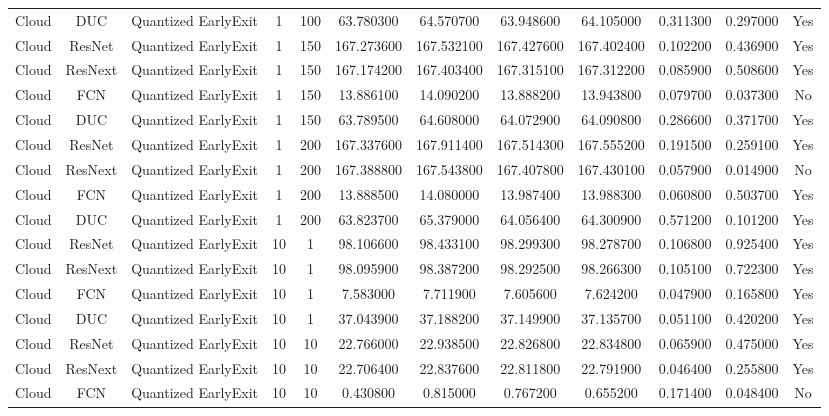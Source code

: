 \begin{tabular}{|c||c||c||c||c||c||c||c||c||c||c||c|}
Cloud & DUC & Quantized EarlyExit & 1 & 100 & 63.780300 & 64.570700 & 63.948600 & 64.105000 & 0.311300 & 0.297000 & Yes \\
Cloud & ResNet & Quantized EarlyExit & 1 & 150 & 167.273600 & 167.532100 & 167.427600 & 167.402400 & 0.102200 & 0.436900 & Yes \\
Cloud & ResNext & Quantized EarlyExit & 1 & 150 & 167.174200 & 167.403400 & 167.315100 & 167.312200 & 0.085900 & 0.508600 & Yes \\
Cloud & FCN & Quantized EarlyExit & 1 & 150 & 13.886100 & 14.090200 & 13.888200 & 13.943800 & 0.079700 & 0.037300 & No \\
Cloud & DUC & Quantized EarlyExit & 1 & 150 & 63.789500 & 64.608000 & 64.072900 & 64.090800 & 0.286600 & 0.371700 & Yes \\
Cloud & ResNet & Quantized EarlyExit & 1 & 200 & 167.337600 & 167.911400 & 167.514300 & 167.555200 & 0.191500 & 0.259100 & Yes \\
Cloud & ResNext & Quantized EarlyExit & 1 & 200 & 167.388800 & 167.543800 & 167.407800 & 167.430100 & 0.057900 & 0.014900 & No \\
Cloud & FCN & Quantized EarlyExit & 1 & 200 & 13.888500 & 14.080000 & 13.987400 & 13.988300 & 0.060800 & 0.503700 & Yes \\
Cloud & DUC & Quantized EarlyExit & 1 & 200 & 63.823700 & 65.379000 & 64.056400 & 64.300900 & 0.571200 & 0.101200 & Yes \\
Cloud & ResNet & Quantized EarlyExit & 10 & 1 & 98.106600 & 98.433100 & 98.299300 & 98.278700 & 0.106800 & 0.925400 & Yes \\
Cloud & ResNext & Quantized EarlyExit & 10 & 1 & 98.095900 & 98.387200 & 98.292500 & 98.266300 & 0.105100 & 0.722300 & Yes \\
Cloud & FCN & Quantized EarlyExit & 10 & 1 & 7.583000 & 7.711900 & 7.605600 & 7.624200 & 0.047900 & 0.165800 & Yes \\
Cloud & DUC & Quantized EarlyExit & 10 & 1 & 37.043900 & 37.188200 & 37.149900 & 37.135700 & 0.051100 & 0.420200 & Yes \\
Cloud & ResNet & Quantized EarlyExit & 10 & 10 & 22.766000 & 22.938500 & 22.826800 & 22.834800 & 0.065900 & 0.475000 & Yes \\
Cloud & ResNext & Quantized EarlyExit & 10 & 10 & 22.706400 & 22.837600 & 22.811800 & 22.791900 & 0.046400 & 0.255800 & Yes \\
Cloud & FCN & Quantized EarlyExit & 10 & 10 & 0.430800 & 0.815000 & 0.767200 & 0.655200 & 0.171400 & 0.048400 & No \\

\end{tabular}
